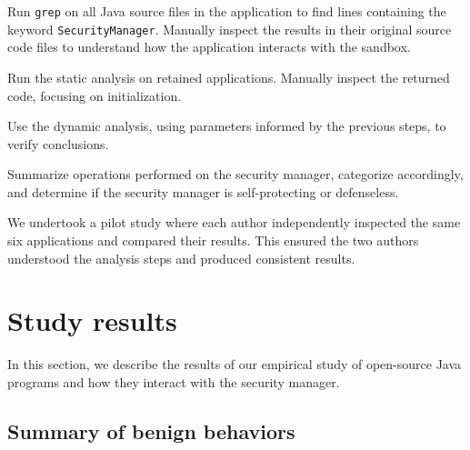 \documentclass{sig-alternate-05-2015}
\begin{document}
\begin{flushenum}\setlength{\parskip}{0pt}
  \setlength{\parsep}{0pt}
  \setlength{\itemsep}{0pt}
\item Run \texttt{grep} on all Java source files in the application to find
lines containing the keyword \texttt{SecurityManager}.
Manually inspect the results in their original source code files to understand
how the application interacts with the sandbox.
\item Run the static analysis on retained applications. Manually inspect the
  returned code, focusing on initialization. 
\item Use the dynamic analysis, using parameters
  informed by the previous steps, 
to verify conclusions.
\item Summarize operations performed
on the security manager, categorize accordingly, and determine if the 
security manager is self-protecting or defenseless.
\end{flushenum}

We undertook a pilot study where each author
independently inspected the same six applications and compared their
results. This ensured the two authors understood the analysis steps 
and produced consistent results.


\section{Study results}\label{sec:Study-results}

In this section, we describe the results of our empirical study of open-source
Java programs and how they interact with the security manager. 

\subsection{Summary of benign behaviors}\label{sub:Evaluation-of-the-hypotheses}
\end{document}
